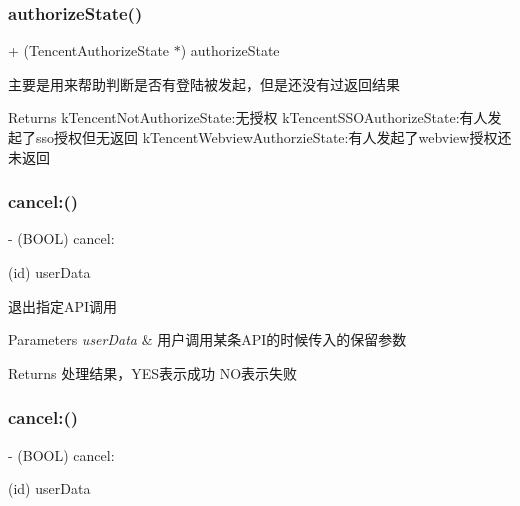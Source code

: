 \subsubsection{\texorpdfstring{authorize\+State()}{authorizeState()}\hspace{0.1cm}{\footnotesize\ttfamily [2/2]}}
{\footnotesize\ttfamily + (Tencent\+Authorize\+State $\ast$) authorize\+State \begin{DoxyParamCaption}{ }\end{DoxyParamCaption}}

主要是用来帮助判断是否有登陆被发起，但是还没有过返回结果 \begin{DoxyReturn}{Returns}
k\+Tencent\+Not\+Authorize\+State\+:无授权 k\+Tencent\+S\+S\+O\+Authorize\+State\+:有人发起了sso授权但无返回 k\+Tencent\+Webview\+Authorzie\+State\+:有人发起了webview授权还未返回 
\end{DoxyReturn}
\mbox{\label{interface_tencent_o_auth_a03709122ebf51c3b78bdd95bf07e505b}} 
\subsubsection{\texorpdfstring{cancel\+:()}{cancel:()}\hspace{0.1cm}{\footnotesize\ttfamily [1/2]}}
{\footnotesize\ttfamily -\/ (B\+O\+OL) cancel\+: \begin{DoxyParamCaption}\item[{(id)}]{user\+Data }\end{DoxyParamCaption}}

退出指定\+A\+P\+I调用 
\begin{DoxyParams}{Parameters}
{\em user\+Data} & 用户调用某条\+A\+P\+I的时候传入的保留参数 \\
\hline
\end{DoxyParams}
\begin{DoxyReturn}{Returns}
处理结果，\+Y\+E\+S表示成功 N\+O表示失败 
\end{DoxyReturn}
\mbox{\label{interface_tencent_o_auth_a03709122ebf51c3b78bdd95bf07e505b}} 
\subsubsection{\texorpdfstring{cancel\+:()}{cancel:()}\hspace{0.1cm}{\footnotesize\ttfamily [2/2]}}
{\footnotesize\ttfamily -\/ (B\+O\+OL) cancel\+: \begin{DoxyParamCaption}\item[{(id)}]{user\+Data }\end{DoxyParamCaption}}

